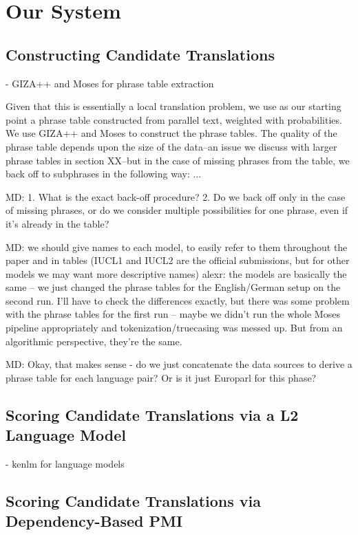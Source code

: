 \documentclass[11pt]{article}
\begin{document}
\section{Our  System}

\subsection{Constructing Candidate Translations}

- GIZA++ and Moses for phrase table extraction

Given that this is essentially a local translation problem, we use as our starting point a phrase table constructed from parallel text, weighted with probabilities.  We use GIZA++ \cite{och:ney:00} and Moses \cite{koehn:hoang:ea:07} to construct the phrase tables.  The quality of the phrase table depends upon the size of the data--an issue we discuss with larger phrase tables in section XX--but in the case of missing phrases from the table, we back off to subphrases in the following way: ...

MD: 1. What is the exact back-off procedure? 2. Do we back off only in the case of missing phrases, or do we consider multiple possibilities for one phrase, even if it’s already in the table?

MD: we should give names to each model, to easily refer to them throughout the paper and in tables (IUCL1 and IUCL2 are the official submissions, but for other models we may want more descriptive names)
alexr: the models are basically the same -- we just changed the phrase tables for the English/German setup on the second run. I'll have to check the differences exactly, but there was some problem with the phrase tables for the first run -- maybe we didn't run the whole Moses pipeline appropriately and tokenization/truecasing was messed up. But from an algorithmic perspective, they're the same.

MD: Okay, that makes sense - do we just concatenate the data sources to derive a phrase table for each language pair?  Or is it just Europarl for this phase?

\subsection{Scoring Candidate Translations via a L2 Language Model}
- kenlm for language models \cite{heafield:kenlm:11}

\subsection{Scoring Candidate Translations via Dependency-Based PMI}
\label{sec:dependencyPMI}
\end{document}

